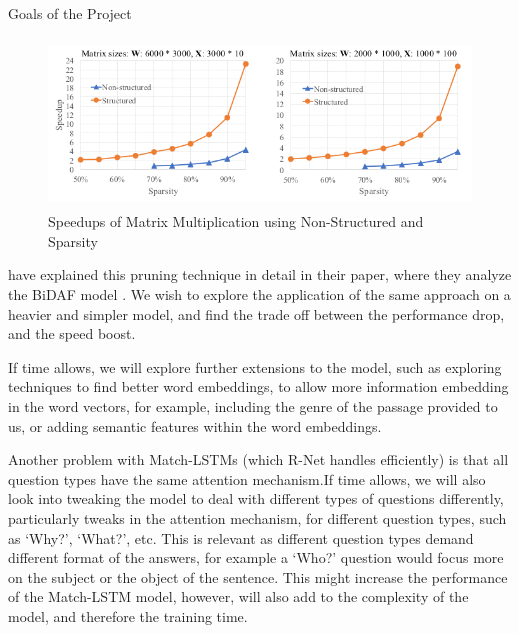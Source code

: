 \documentclass{article}
\begin{document}
\begin{psection}{Goals of the Project}
	\begin{figure}[ht!]
		\centering
		\includegraphics[height=170px]{includes/iss-graph.png}
		\caption{Speedups of Matrix Multiplication using Non-Structured and Sparsity }
		\label{fig:iss-graph}
	\end{figure}

	 have explained this pruning technique in detail in their paper, where they analyze the BiDAF model \citep{bidaf}. We wish to explore the application of the same approach on a heavier and simpler model, and find the trade off between the performance drop, and the speed boost.

	If time allows, we will explore further extensions to the model, such as exploring techniques to find better word embeddings, to allow more information embedding in the word vectors, for example, including the genre of the passage provided to us, or adding semantic features within the word embeddings.

	Another problem with Match-LSTMs (which R-Net handles efficiently) is that all question types have the same attention mechanism.If time allows, we will also look into tweaking the model to deal with different types of questions differently, particularly tweaks in the attention mechanism, \ie for different question types, such as `Why?', `What?', etc.
	This is relevant as different question types demand different format of the answers, for example a `Who?' question would focus more on the subject or the object of the sentence. This might increase the performance of the Match-LSTM model, however, will also add to the complexity of the model, and therefore the training time.

\end{psection}



\end{document}
